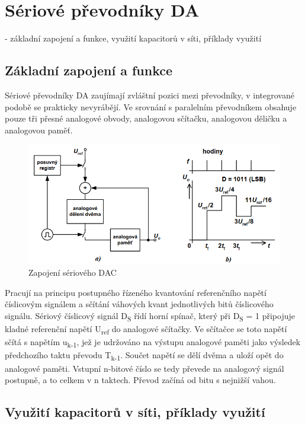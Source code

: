 \section{Sériové převodníky DA}
- základní zapojení a funkce, využití kapacitorů v síti, příklady využití

\subsection{Základní zapojení a funkce}
Sériové převodníky DA zaujímají zvláštní pozici mezi převodníky, v integrované podobě se prakticky nevyrábějí. Ve srovnání s paralelním převodníkem obsahuje pouze tři přesné analogové obvody, analogovou sčítačku, analogovou děličku a analogovou paměť.
\begin{figure}[h]
   \begin{center}
     \includegraphics[scale=0.6]{images/DAser.png}
   \end{center}
   \caption{Zapojení sériového DAC}
\end{figure}

Pracují na principu postupného řízeného kvantování referenčního napětí číslicovým
signálem a sčítání váhových kvant jednotlivých bitů číslicového signálu. Sériový číslicový signál D\textsubscript{S} řídí horní spínač, který při D\textsubscript{S} = 1 připojuje kladné referenční napětí U\textsubscript{ref} do analogové sčítačky. Ve sčítačce se toto napětí sčítá s napětím u\textsubscript{k-1}, jež je udržováno na výstupu analogové paměti jako výsledek předchozího taktu převodu T\textsubscript{k-1}. Součet napětí se dělí dvěma a uloží opět do analogové paměti. Vstupní n-bitové číslo se tedy převede na analogový signál postupně, a to celkem v n taktech. Převod začíná od bitu s nejnižší vahou.

\subsection{Využití kapacitorů v síti, příklady využití}

